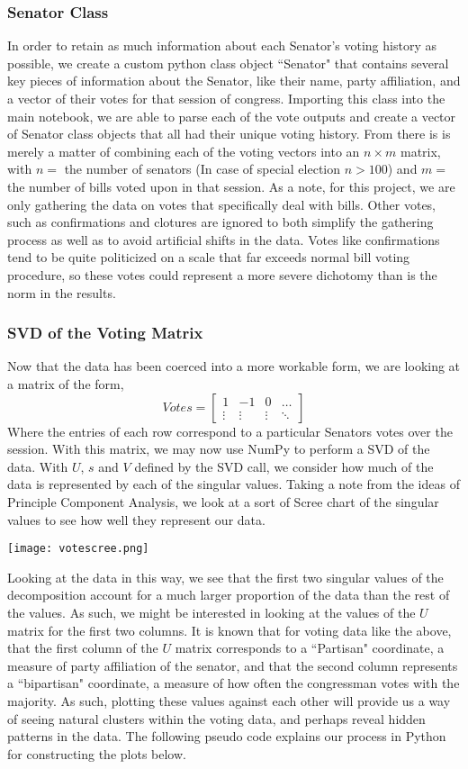 \documentclass[letterpaper,12pt]{article}
\begin{document}
\subsubsection{Senator Class}
In order to retain as much information about each Senator's voting history as possible, we create a custom python class object ``Senator" that contains several key pieces of information about the Senator, like their name, party affiliation, and a vector of their votes for that session of congress. Importing this class into the main notebook, we are able to parse each of the vote outputs and create a vector of Senator class objects that all had their unique voting history. From there is is merely a matter of combining each of the voting vectors into an $n\times m$ matrix, with $n=$ the number of senators (In case of special election $n> 100$) and $m=$ the number of bills voted upon in that session. As a note, for this project, we are only gathering the data on votes that specifically deal with bills. Other votes, such as confirmations and clotures are ignored to both simplify the gathering process as well as to avoid artificial shifts in the data. Votes like confirmations tend to be quite politicized on a scale that far exceeds normal bill voting procedure, so these votes could represent a more severe dichotomy than is the norm in the results.
\subsubsection{SVD of the Voting Matrix}
Now that the data has been coerced into a more workable form, we are looking at a matrix of the form,
\[Votes=\begin{bmatrix}
1 & -1 & 0 & \ldots\\
\vdots & \vdots & \vdots & \ddots
\end{bmatrix} \]
Where the entries of each row correspond to a particular Senators votes over the session. With this matrix, we may now use NumPy to perform a SVD of the data. With $U$, $s$ and $V$ defined by the SVD call, we consider how much of the data is represented by each of the singular values. Taking a note from the ideas of Principle Component Analysis, we look at a sort of Scree chart of the singular values to see how well they represent our data.
\begin{center}
\texttt{[image: votescree.png]}
\end{center}
Looking at the data in this way, we see that the first two singular values of the decomposition account for a much larger proportion of the data than the rest of the values. As such, we might be interested in looking at the values of the $U$ matrix for the first two columns. It is known that for voting data like the above, that the first column of the $U$ matrix corresponds to a ``Partisan" coordinate, a measure of party affiliation of the senator, and that the second column represents a ``bipartisan" coordinate, a measure of how often the congressman votes with the majority.\cite{Extra} As such, plotting these values against each other will provide us a way of seeing natural clusters within the voting data, and perhaps reveal hidden patterns in the data. The following pseudo code explains our process in Python for constructing the plots below.
\end{document}
